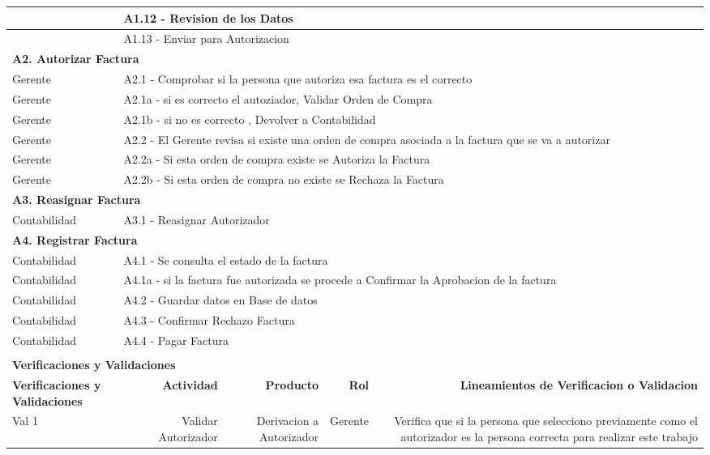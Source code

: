 \begin{longtable}{|llrrrrrr|}
    & \multicolumn{7}{|l|}{A1.12 - Revision de los Datos } \\ \hline 
    & \multicolumn{7}{|l|}{A1.13 - Enviar para Autorizacion} \\ \hline
    \multicolumn{8}{|l|}{\textbf{A2. Autorizar Factura}} \\ \hline
    Gerente & \multicolumn{7}{|m{12cm}|}{A2.1 - Comprobar si la persona que autoriza esa factura es el correcto} \\ \hline
    Gerente & \multicolumn{7}{|l|}{A2.1a - si es correcto el autoziador, Validar Orden de Compra } \\ \hline
    Gerente & \multicolumn{7}{|l|}{A2.1b - si no es correcto , Devolver a Contabilidad} \\ \hline
    Gerente & \multicolumn{7}{|m{12cm}|}{A2.2 - El Gerente revisa si existe una orden de compra asociada a la factura que se va a autorizar } \\ \hline
    Gerente & \multicolumn{7}{|l|}{A2.2a - Si esta orden de compra existe se Autoriza la Factura } \\ \hline
	Gerente & \multicolumn{7}{|l|}{A2.2b - Si esta orden de compra no existe se Rechaza la Factura } \\ \hline
    \multicolumn{8}{|l|}{\textbf{A3. Reasignar Factura}} \\ \hline
    Contabilidad & \multicolumn{7}{|l|}{A3.1 - Reasignar Autorizador} \\ \hline
    \multicolumn{8}{|l|}{\textbf{A4. Registrar Factura}} \\ \hline
    Contabilidad & \multicolumn{7}{|l|}{A4.1 - Se consulta el estado de la factura} \\ \hline
    Contabilidad & \multicolumn{7}{|m{12cm}|}{A4.1a - si la factura fue autorizada se procede a Confirmar la Aprobacion de la factura} \\ \hline
    Contabilidad  & \multicolumn{7}{|l|}{A4.2 - Guardar datos en Base de datos} \\ \hline
    Contabilidad  & \multicolumn{7}{|l|}{A4.3 - Confirmar Rechazo Factura} \\ \hline
    Contabilidad  & \multicolumn{7}{|l|}{A4.4 - Pagar Factura} \\ \hline
     & & & & & & & \\ \hline
	\multicolumn{8}{|l|}{\textbf{Verificaciones y Validaciones}} \\ \hline
	\multicolumn{2}{|m{3cm}|}{\textbf{Verificaciones y Validaciones}} & \multicolumn{1}{m{2cm}|}{\textbf{Actividad}} & \multicolumn{1}{m{2,2cm}|}{\textbf{Producto}} & \multicolumn{1}{m{1.5cm}|}{\textbf{Rol}} &\multicolumn{3}{m{4cm}|}{\textbf{Lineamientos de Verificacion o Validacion}} \\ \hline
	\multicolumn{2}{|m{3cm}|}{Val 1} & \multicolumn{1}{m{2cm}|}{Validar Autorizador} & \multicolumn{1}{m{2.2cm}|}{Derivacion a Autorizador} & \multicolumn{1}{m{2cm}|}{Gerente} & \multicolumn{3}{m{4cm}|}{Verifica que si la persona que selecciono previamente como el autorizador es la persona correcta para realizar este trabajo} \\ \hline
		

\end{longtable}
